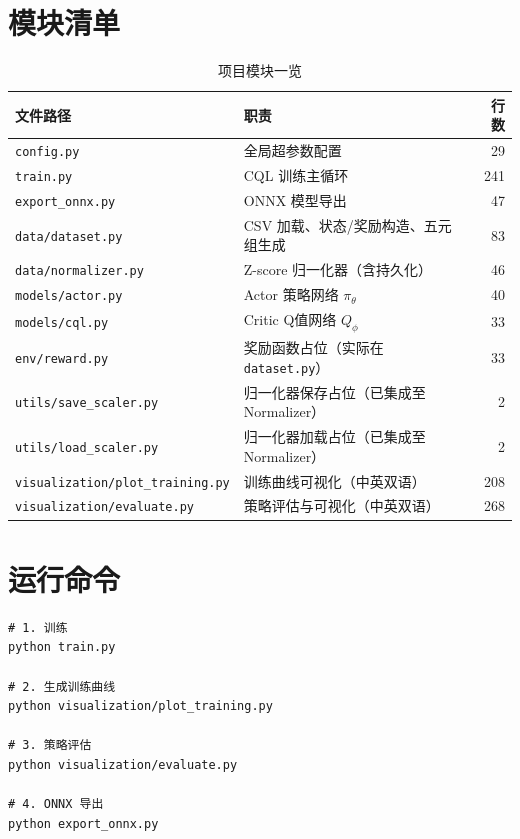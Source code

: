 \documentclass[11pt,a4paper]{ctexart}
\newcommand{\file}[1]{\texttt{#1}}
\begin{document}
\newpage

\section{模块清单}

\begin{table}[H]
\centering
\caption{项目模块一览}
\begin{tabular}{p{5.5cm}p{6.5cm}r}
\toprule
\textbf{文件路径} & \textbf{职责} & \textbf{行数} \\
\midrule
\file{config.py}                  & 全局超参数配置                          & 29 \\
\file{train.py}                   & CQL 训练主循环                          & 241 \\
\file{export\_onnx.py}            & ONNX 模型导出                           & 47 \\
\file{data/dataset.py}           & CSV 加载、状态/奖励构造、五元组生成     & 83 \\
\file{data/normalizer.py}        & Z-score 归一化器（含持久化）            & 46 \\
\file{models/actor.py}           & Actor 策略网络 $\pi_{\theta}$           & 40 \\
\file{models/cql.py}             & Critic Q值网络 $Q_{\phi}$               & 33 \\
\file{env/reward.py}             & 奖励函数占位（实际在 \file{dataset.py}） & 33 \\
\file{utils/save\_scaler.py}     & 归一化器保存占位（已集成至 Normalizer） & 2 \\
\file{utils/load\_scaler.py}     & 归一化器加载占位（已集成至 Normalizer） & 2 \\
\file{visualization/plot\_training.py} & 训练曲线可视化（中英双语）         & 208 \\
\file{visualization/evaluate.py}      & 策略评估与可视化（中英双语）       & 268 \\
\bottomrule
\end{tabular}
\end{table}

\newpage

\appendix
\section{运行命令}

\begin{lstlisting}[caption={运行命令}, label={lst:run}]
# 1. 训练
python train.py

# 2. 生成训练曲线
python visualization/plot_training.py

# 3. 策略评估
python visualization/evaluate.py

# 4. ONNX 导出
python export_onnx.py
\end{lstlisting}
\end{document}
